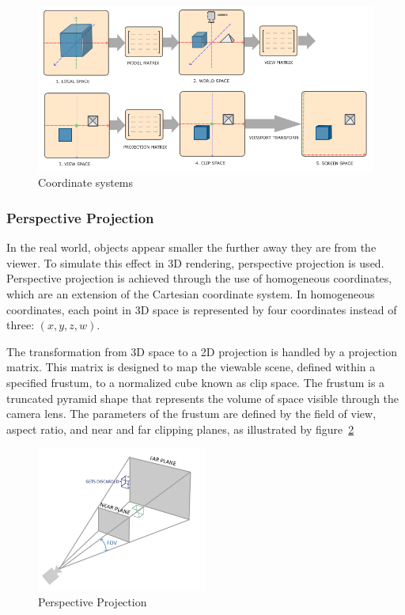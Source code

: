 \begin{figure}[h!]
    \centering
    \includegraphics[width=\linewidth]{images/coordinate_systems}
    \caption{Coordinate systems}
    \label{fig:coordinate-systems}
\end{figure}

\subsubsection{Perspective Projection}\label{sec:perspective-projection}
In the real world, objects appear smaller the further away they are from the viewer.
To simulate this effect in 3D rendering, perspective projection is used.
Perspective projection is achieved through the use of homogeneous coordinates,
which are an extension of the Cartesian coordinate system.
In homogeneous coordinates, each point in 3D space is represented by four coordinates instead of three: $(x, y, z, w)$.

The transformation from 3D space to a 2D projection is handled by a projection matrix.
This matrix is designed to map the viewable scene, defined within a specified frustum, to a normalized cube known as clip space.
The frustum is a truncated pyramid shape that represents the volume of space visible through the camera lens.
The parameters of the frustum are defined by the field of view, aspect ratio, and near and far clipping planes,
as illustrated by figure~\ref{fig:perspective}
\begin{figure}[h]
    \centering
    \includegraphics[width=0.50\textwidth]{images/perspective}
    \caption{Perspective Projection}
    \label{fig:perspective}
\end{figure}

